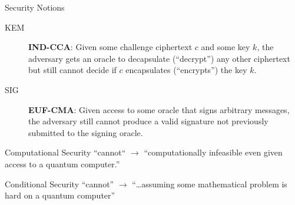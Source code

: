 \documentclass[xcolor=table,10pt,aspectratio=169]{beamer}
\begin{document}
\begin{frame}[label={sec:org93cb285}]{Security Notions}
\begin{description}
\item[{KEM}] \textbf{IND-CCA}: Given some challenge ciphertext \(c\) and some key \(k\), the adversary gets an oracle to decapsulate (“decrypt”) any other ciphertext but still cannot decide if \(c\) encapsulates (“encrypts”) the key \(k\).

\item[{SIG}] \textbf{EUF-CMA}: Given access to some oracle that signs arbitrary messages, the adversary still cannot produce a valid signature not previously submitted to the signing oracle.
\end{description}

\pause

\begin{block}{Computational Security}
“cannot“ \(\rightarrow\) “computationally infeasible even given access to a quantum computer.”


\pause
\end{block}

\begin{block}{Conditional Security}
“cannot” \(\rightarrow\) “\ldots assuming some mathematical problem is hard on a quantum computer”
\end{block}
\end{frame}
\end{document}
